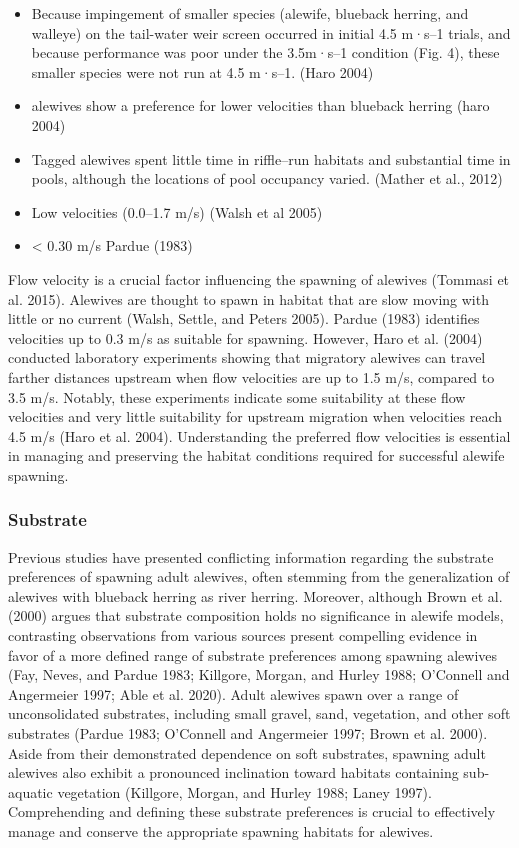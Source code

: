 \documentclass[
]{book}
\begin{document}
\begin{itemize}
\item
  Because impingement of smaller species (alewife, blueback herring, and walleye) on the tail-water weir screen occurred in initial 4.5 m·s--1 trials, and because performance was poor under the 3.5m·s--1 condition (Fig. 4), these smaller species were not run at 4.5 m·s--1. (Haro 2004)
\item
  alewives show a preference for lower velocities than blueback herring (haro 2004)
\item
  Tagged alewives spent little time in riffle--run habitats and substantial time in pools, although the locations of pool occupancy varied. (Mather et al., 2012)
\item
  Low velocities (0.0--1.7 m/s) (Walsh et al 2005)
\item
  \textless{} 0.30 m/s Pardue (1983)
\end{itemize}

Flow velocity is a crucial factor influencing the spawning of alewives (Tommasi et al. 2015).
Alewives are thought to spawn in habitat that are slow moving with little or no current (Walsh, Settle, and Peters 2005).
Pardue (1983) identifies velocities up to 0.3 m/s as suitable for spawning.
However, Haro et al. (2004) conducted laboratory experiments showing that migratory alewives can travel farther distances upstream when flow velocities are up to 1.5 m/s, compared to 3.5 m/s.
Notably, these experiments indicate some suitability at these flow velocities and very little suitability for upstream migration when velocities reach 4.5 m/s (Haro et al. 2004).
Understanding the preferred flow velocities is essential in managing and preserving the habitat conditions required for successful alewife spawning.

\hypertarget{substrate}{%
\subsubsection{Substrate}\label{substrate}}

Previous studies have presented conflicting information regarding the substrate preferences of spawning adult alewives, often stemming from the generalization of alewives with blueback herring as river herring.
Moreover, although Brown et al. (2000) argues that substrate composition holds no significance in alewife models, contrasting observations from various sources present compelling evidence in favor of a more defined range of substrate preferences among spawning alewives (Fay, Neves, and Pardue 1983; Killgore, Morgan, and Hurley 1988; O'Connell and Angermeier 1997; Able et al. 2020).
Adult alewives spawn over a range of unconsolidated substrates, including small gravel, sand, vegetation, and other soft substrates (Pardue 1983; O'Connell and Angermeier 1997; Brown et al. 2000).
Aside from their demonstrated dependence on soft substrates, spawning adult alewives also exhibit a pronounced inclination toward habitats containing sub-aquatic vegetation (Killgore, Morgan, and Hurley 1988; Laney 1997).
Comprehending and defining these substrate preferences is crucial to effectively manage and conserve the appropriate spawning habitats for alewives.
\end{document}
